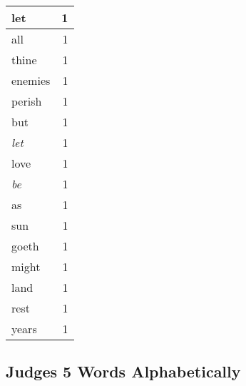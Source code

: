 \begin{center}
\begin{longtable}{l|r}
let & 1\\ \hline 
all & 1\\ \hline 
thine & 1\\ \hline 
enemies & 1\\ \hline 
perish & 1\\ \hline 
but & 1\\ \hline 
\emph{let} & 1\\ \hline 
love & 1\\ \hline 
\emph{be} & 1\\ \hline 
as & 1\\ \hline 
sun & 1\\ \hline 
goeth & 1\\ \hline 
might & 1\\ \hline 
land & 1\\ \hline 
rest & 1\\ \hline 
years & 1\\ \hline 
\end{longtable}
\end{center}





\subsection{Judges 5 Words Alphabetically}


\normalsize
 
